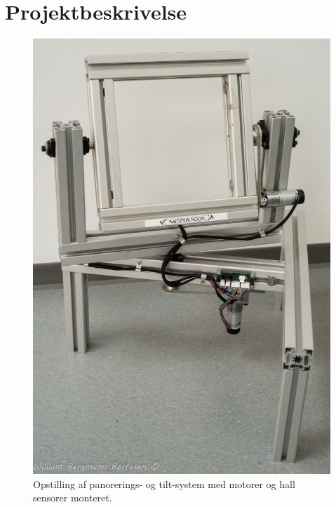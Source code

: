 \section{Projektbeskrivelse}

\begin{figure}[H]
	\begin{center}
		\includegraphics[scale=0.15]{Billeder/opstilling.jpg}
		\caption{Opstilling af panorerings- og tilt-system med motorer og hall sensorer monteret.}
		\label{fig:Opstilling}
	\end{center}
\end{figure}

